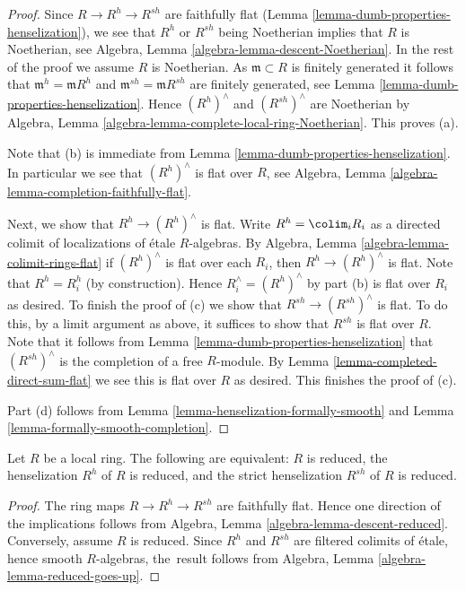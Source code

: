 \begin{proof}
Since $R \to R^h \to R^{sh}$ are faithfully flat
(Lemma \ref{lemma-dumb-properties-henselization}),
we see that $R^h$ or $R^{sh}$ being Noetherian implies that $R$
is Noetherian, see Algebra, Lemma \ref{algebra-lemma-descent-Noetherian}.
In the rest of the proof we assume $R$ is Noetherian.
As $\mathfrak m \subset R$ is finitely generated it follows that
$\mathfrak m^h = \mathfrak m R^h$ and $\mathfrak m^{sh} = \mathfrak mR^{sh}$
are finitely generated, see Lemma \ref{lemma-dumb-properties-henselization}.
Hence $(R^h)^\wedge$ and $(R^{sh})^\wedge$ are Noetherian by
Algebra, Lemma \ref{algebra-lemma-complete-local-ring-Noetherian}.
This proves (a).

\medskip\noindent
Note that (b) is immediate from
Lemma \ref{lemma-dumb-properties-henselization}.
In particular we see that $(R^h)^\wedge$ is flat over $R$, see
Algebra, Lemma \ref{algebra-lemma-completion-faithfully-flat}.

\medskip\noindent
Next, we show that $R^h \to (R^h)^\wedge$ is flat.
Write $R^h = \colim_i R_i$ as a directed colimit of
localizations of \'etale $R$-algebras. By
Algebra, Lemma \ref{algebra-lemma-colimit-rings-flat}
if $(R^h)^\wedge$ is flat over each $R_i$, then $R^h \to (R^h)^\wedge$ is
flat. Note that $R^h = R_i^h$ (by construction).
Hence $R_i^\wedge = (R^h)^\wedge$
by part (b) is flat over $R_i$ as desired. To finish the proof of (c)
we show that $R^{sh} \to (R^{sh})^\wedge$ is flat. To do this, by a
limit argument as above, it suffices to show that $R^{sh}$ is flat over $R$.
Note that it follows from Lemma \ref{lemma-dumb-properties-henselization}
that $(R^{sh})^\wedge$ is the completion of a free $R$-module.
By Lemma \ref{lemma-completed-direct-sum-flat}
we see this is flat over $R$ as desired. This finishes the proof of (c).

\medskip\noindent
Part (d) follows from Lemma \ref{lemma-henselization-formally-smooth}
and Lemma \ref{lemma-formally-smooth-completion}.
\end{proof}

\begin{lemma}
\label{lemma-henselization-reduced}
Let $R$ be a local ring.
The following are equivalent: $R$ is reduced,
the henselization $R^h$ of $R$ is reduced, and
the strict henselization $R^{sh}$ of $R$ is reduced.
\end{lemma}

\begin{proof}
The ring maps $R \to R^h \to R^{sh}$ are faithfully flat.
Hence one direction of the implications follows from
Algebra, Lemma \ref{algebra-lemma-descent-reduced}.
Conversely, assume $R$ is reduced. Since $R^h$ and $R^{sh}$
are filtered colimits of \'etale, hence smooth $R$-algebras, the\
result follows from
Algebra, Lemma \ref{algebra-lemma-reduced-goes-up}.
\end{proof}

